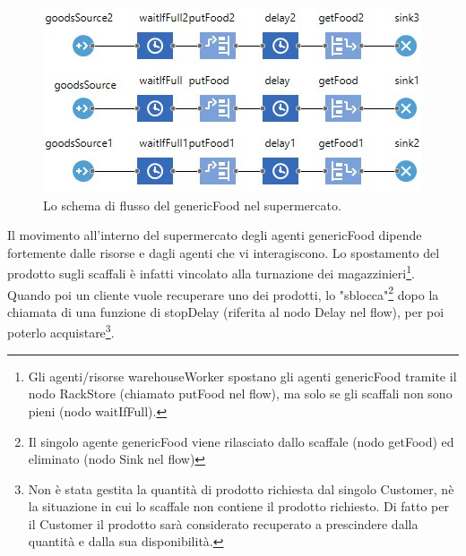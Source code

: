 \documentclass{article}
\begin{document}
\begin{center}
\begin{figure}[h]
\center
\label{foodflow}
\includegraphics[scale=0.5]{./food_flow.jpeg}
\caption{\footnotesize{Lo schema di flusso del genericFood nel supermercato.}}
\end{figure}
\end{center}
Il movimento all'interno del supermercato degli agenti genericFood dipende fortemente dalle risorse e dagli agenti che vi interagiscono. Lo spostamento del prodotto sugli scaffali è infatti vincolato alla turnazione dei magazzinieri\footnote{\footnotesize{Gli agenti/risorse warehouseWorker spostano gli agenti genericFood tramite il nodo RackStore (chiamato \textsf{putFood} nel flow), ma solo se gli scaffali non sono pieni (nodo \textsf{waitIfFull}).}}. Quando poi un cliente vuole recuperare uno dei prodotti, lo "sblocca"\footnote{\footnotesize{Il singolo agente genericFood viene rilasciato dallo scaffale (nodo \textsf{getFood}) ed eliminato (nodo \textsf{Sink} nel flow)}} dopo la chiamata di una funzione di \textsf{stopDelay} (riferita al nodo \textsf{Delay} nel flow), per poi poterlo acquistare\footnote{\footnotesize{Non è stata gestita la quantità di prodotto richiesta dal singolo Customer, nè la situazione in cui lo scaffale non contiene il prodotto richiesto. Di fatto per il Customer il prodotto sarà considerato recuperato a prescindere dalla quantità e dalla sua disponibilità.}}.
\end{document}
